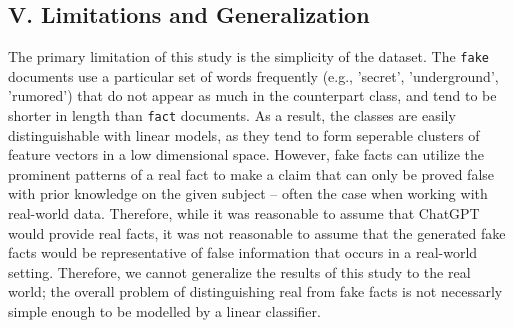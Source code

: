 \documentclass[11pt]{article}
\begin{document}
\subsection*{V. Limitations and Generalization}
The primary limitation of this study is the simplicity of the dataset.
The \texttt{fake} documents use a particular set of words 
frequently (e.g., 'secret', 'underground', 'rumored')
that do not appear as much in the counterpart class, and
tend to be shorter in length than \texttt{fact} documents.
As a result, the classes are easily distinguishable with linear models,
as they tend to form seperable clusters of feature vectors in a low dimensional space. However,
fake facts can utilize the prominent patterns
of a real fact to make a claim that can only be proved 
false with prior knowledge on the given subject – often the case when working with real-world data.
Therefore, while it was reasonable to assume that ChatGPT would provide real facts,
it was not reasonable to assume that the generated 
fake facts would be representative of false
information that occurs in a real-world setting. 
Therefore, we cannot generalize the results of this
study to the real world; 
the overall problem of distinguishing real from fake
facts is not necessarly simple enough to be modelled by
a linear classifier.
\end{document}
